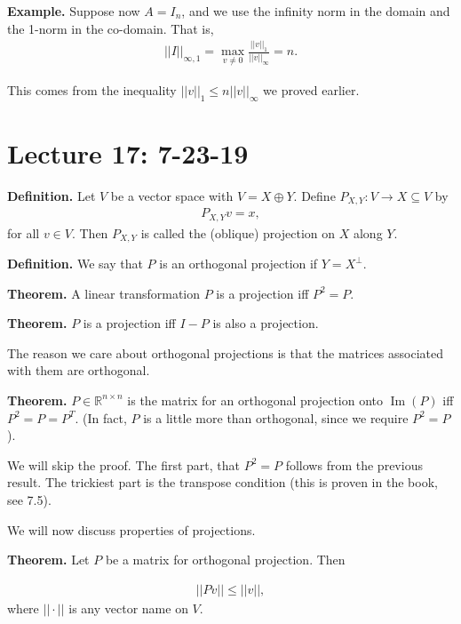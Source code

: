 \documentclass{article}
\newcommand{\RR}{\mathbb{R}}
\DeclareMathOperator{\Ima}{Im}
\DeclareMathOperator{\Ima}{Im}
\begin{document}
{\bf Example.} Suppose now $A = I_n$, and we use the infinity norm in the domain and the 1-norm in the co-domain.  That is,
\begin{align*}
  ||I||_{\infty, 1} = \max_{v \neq 0} \frac{||v||_1}{||v||_{\infty}} = n.
\end{align*}

This comes from the inequality $||v||_1 \leq n ||v||_{\infty}$ we proved earlier.

\section{Lecture 17: 7-23-19}

{\bf Definition.} Let $V$ be a vector space with $V = X \oplus Y$.  Define $P_{X, Y}: V \to X \subseteq V$ by
\begin{align*}
  P_{X, Y} v = x,
\end{align*}
for all $v \in V$.  Then $P_{X, Y}$ is called the (oblique) projection on $X$ along $Y$.

{\bf Definition.} We say that $P$ is an orthogonal projection if $Y = X^{\perp}$.

{\bf Theorem.} A linear transformation $P$ is a projection iff $P^2 = P$.

{\bf Theorem.} $P$ is a projection iff $I - P$ is also a projection. 

The reason we care about orthogonal projections is that the matrices associated with them are orthogonal.

{\bf Theorem.} $P \in \RR^{n \times n}$ is the matrix for an orthogonal projection onto $\Ima (P)$ iff $P^2 = P = P^T$.  (In fact, $P$ is a little more than orthogonal, since we require $P^2 = P$).

We will skip the proof.  The first part, that $P^2 = P$ follows from the previous result.  The trickiest part is the transpose condition (this is proven in the book, see 7.5).

We will now discuss properties of projections.

{\bf Theorem.} Let $P$ be a matrix for orthogonal projection.  Then

\begin{align*}
  || P v || \leq ||v||,
\end{align*}
where $|| \cdot ||$ is any vector name on $V$.

\end{document}
